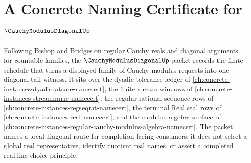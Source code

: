 \chapter{A Concrete Naming Certificate for $\CauchyModulusDiagonalUp$}
\label{ch:concrete-instances-cauchy-modulus-diagonal-namecert}

Following Bishop and Bridges on regular Cauchy reals and diagonal arguments for countable families, the $\CauchyModulusDiagonalUp$ packet records the finite schedule that turns a displayed family of Cauchy-modulus requests into one diagonal tail witness. It sits over the dyadic tolerance ledger of \autoref{ch:concrete-instances-dyadicratcore-namecert}, the finite stream windows of \autoref{ch:concrete-instances-streamname-namecert}, the regular rational sequence rows of \autoref{ch:concrete-instances-regseqrat-namecert}, the terminal Real seal rows of \autoref{ch:concrete-instances-real-namecert}, and the modulus algebra surface of \autoref{ch:concrete-instances-regular-cauchy-modulus-algebra-namecert}. The packet names a local diagonal route for completion-facing consumers; it does not select a global real representative, identify quotient real names, or assert a completed real-line choice principle.

